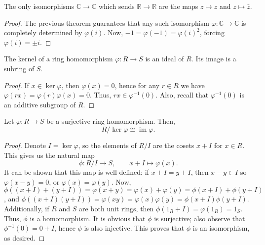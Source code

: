 \documentclass[11pt]{article}
\newcommand{\C}{\mathbb{C}}
\newcommand{\R}{\mathbb{R}}
\DeclareMathOperator{\im}{im}
\theoremstyle{definition}
\theoremstyle{remark}
\numberwithin{equation}{section}
\begin{document}
    \begin{theorem}
        The only isomorphisms $\C \to \C$ which sends $\R \to \R$ are the maps $z
        \mapsto z$ and $z \mapsto \bar{z}$.
    \end{theorem}
    \begin{proof}
        The previous theorem guarantees that any such isomorphism $\varphi\colon \C
        \to \C$ is completely determined by $\varphi(i)$. Now, $-1 = \varphi(-1) =
        \varphi(i)^2$, forcing $\varphi(i) = \pm i$.
    \end{proof}

    \begin{lemma}
        The kernel of a ring homomorphism $\varphi\colon R \to S$ is an ideal of $R$.
        Its image is a subring of $S$.
    \end{lemma}
    \begin{proof}
        If $x \in \ker\varphi$, then $\varphi(x) = 0$, hence for any $r \in R$ we
        have $\varphi(rx) = \varphi(r) \varphi(x) = 0$. Thus, $rx \in
        \varphi^{-1}(0)$. Also, recall that $\varphi^{-1}(0)$ is an additive subgroup
        of $R$.
    \end{proof}

    \begin{theorem}
        Let $\varphi\colon R \to S$ be a surjective ring homomorphism. Then, \[
            R / \ker{\varphi} \cong \im{\varphi}.
        \] 
    \end{theorem}
    \begin{proof}
        Denote $I = \ker{\varphi}$, so the elements of $R/I$ are the cosets $x + I$
        for $x \in R$. This gives us the natural map \[
            \phi\colon R/I \to S, \qquad x + I \mapsto \varphi(x).
        \] It can be shown that this map is well defined: if $x + I = y + I$, then $x
        - y \in I$ so $\varphi(x - y) = 0$, or $\varphi(x) = \varphi(y)$. Now,
        $\phi((x + I) + (y + I)) = \varphi(x + y) = \varphi(x) + \varphi(y) = \phi(x
        + I) + \phi(y + I)$, and $\phi((x + I)(y + I)) = \varphi(xy) =
        \varphi(x)\varphi(y) = \phi(x + I)\phi(y + I)$. Additionally, if $R$ and $S$
        are both unit rings, then $\phi(1_R + I) = \varphi(1_R) = 1_S$. Thus, $\phi$
        is a homomorphism. It is obvious that $\phi$ is surjective; also observe that
        $\phi^{-1}(0) = 0 + I$, hence $\phi$ is also injective. This proves that
        $\phi$ is an isomorphism, as desired.
    \end{proof}
\end{document}
